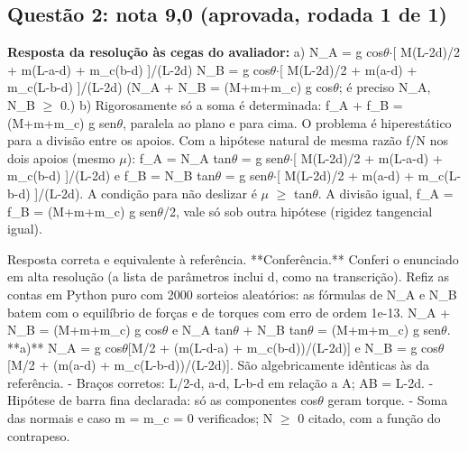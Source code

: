 \documentclass{article}%
\begin{document}
\subsection*{Questão 2: nota 9,0 (aprovada, rodada 1 de 1)}%
\textbf{Resposta da resolução às cegas do avaliador:} a) N\_A = g cos$\theta$$\cdot${[} M(L-2d)/2 + m(L-a-d) + m\_c(b-d) {]}/(L-2d)\newline%
   N\_B = g cos$\theta$$\cdot${[} M(L-2d)/2 + m(a-d) + m\_c(L-b-d) {]}/(L-2d)\newline%
   (N\_A + N\_B = (M+m+m\_c) g cos$\theta$; é preciso N\_A, N\_B $\geq$ 0.)\newline%
\newline%
b) Rigorosamente só a soma é determinada: f\_A + f\_B = (M+m+m\_c) g sen$\theta$, paralela ao plano e para cima. O problema é hiperestático para a divisão entre os apoios. Com a hipótese natural de mesma razão f/N nos dois apoios (mesmo $\mu$): f\_A = N\_A tan$\theta$ = g sen$\theta$$\cdot${[} M(L-2d)/2 + m(L-a-d) + m\_c(b-d) {]}/(L-2d) e f\_B = N\_B tan$\theta$ = g sen$\theta$$\cdot${[} M(L-2d)/2 + m(a-d) + m\_c(L-b-d) {]}/(L-2d). A condição para não deslizar é $\mu$ $\geq$ tan$\theta$. A divisão igual, f\_A = f\_B = (M+m+m\_c) g sen$\theta$/2, vale só sob outra hipótese (rigidez tangencial igual).\par %
Resposta correta e equivalente à referência.\newline%
\newline%
**Conferência.** Conferi o enunciado em alta resolução (a lista de parâmetros inclui d, como na transcrição). Refiz as contas em Python puro com 2000 sorteios aleatórios: as fórmulas de N\_A e N\_B batem com o equilíbrio de forças e de torques com erro de ordem 1e{-}13. N\_A + N\_B = (M+m+m\_c) g cos$\theta$ e N\_A tan$\theta$ + N\_B tan$\theta$ = (M+m+m\_c) g sen$\theta$.\newline%
\newline%
**a)** N\_A = g cos$\theta${[}M/2 + (m(L-d-a) + m\_c(b-d))/(L-2d){]} e N\_B = g cos$\theta${[}M/2 + (m(a-d) + m\_c(L-b-d))/(L-2d){]}. São algebricamente idênticas às da referência.\newline%
{-} Braços corretos: L/2-d, a-d, L-b-d em relação a A; AB = L-2d.\newline%
{-} Hipótese de barra fina declarada: só as componentes cos$\theta$ geram torque.\newline%
{-} Soma das normais e caso m = m\_c = 0 verificados; N $\geq$ 0 citado, com a função do contrapeso.\newline%
\end{document}
